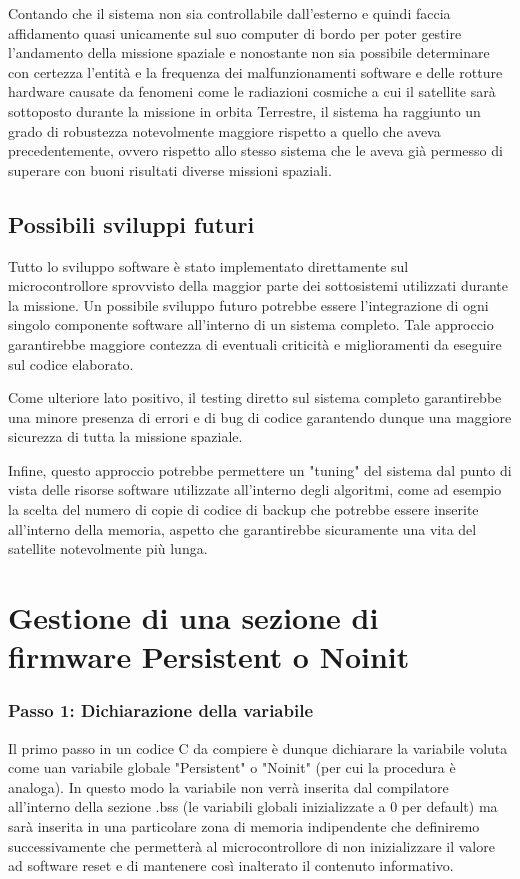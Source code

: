 \documentclass[LaM,binding=0.6cm]{../sapthesis}
\begin{document}
Contando che il sistema non sia controllabile dall'esterno e quindi faccia affidamento quasi unicamente sul suo computer di bordo per poter gestire 
l'andamento della missione spaziale e nonostante non sia possibile determinare con certezza l'entità e la frequenza dei malfunzionamenti software 
e delle rotture hardware causate da fenomeni come le radiazioni cosmiche a cui il satellite sarà sottoposto durante la missione in orbita Terrestre, 
il sistema ha raggiunto un grado di robustezza notevolmente maggiore rispetto a quello che aveva precedentemente, ovvero rispetto allo stesso sistema che le aveva già permesso 
di superare con buoni risultati diverse missioni spaziali.
\section{Possibili sviluppi futuri}
Tutto lo sviluppo software è stato implementato direttamente sul microcontrollore sprovvisto della maggior parte dei sottosistemi utilizzati durante la missione. Un possibile
sviluppo futuro potrebbe essere l'integrazione di ogni singolo componente software all'interno di un sistema completo. Tale approccio garantirebbe maggiore contezza
di eventuali criticità e miglioramenti da eseguire sul codice elaborato. 

Come ulteriore lato positivo, il testing diretto sul sistema completo garantirebbe una  minore presenza di errori e di bug di codice garantendo dunque una maggiore 
sicurezza di tutta la missione spaziale. 

Infine, questo approccio potrebbe permettere un "tuning" del sistema dal punto di vista delle  risorse software utilizzate all'interno degli algoritmi, come ad esempio la scelta del numero di copie di codice di backup che potrebbe essere inserite all'interno della memoria,
aspetto che garantirebbe sicuramente una vita del satellite notevolmente più lunga.
\chapter{Gestione di una sezione di firmware Persistent o Noinit}

\subsection{Passo 1: Dichiarazione della variabile}
Il primo passo in un codice C da compiere è dunque dichiarare la variabile voluta come uan variabile globale "Persistent" o "Noinit" (per cui la procedura è analoga). In questo modo la variabile non verrà inserita dal compilatore all'interno della sezione .bss (le variabili globali inizializzate a 0 per default) ma sarà inserita in una particolare zona di memoria indipendente che definiremo successivamente che permetterà al microcontrollore di non inizializzare il valore ad software reset
e di mantenere così inalterato il contenuto informativo.
\end{document}
